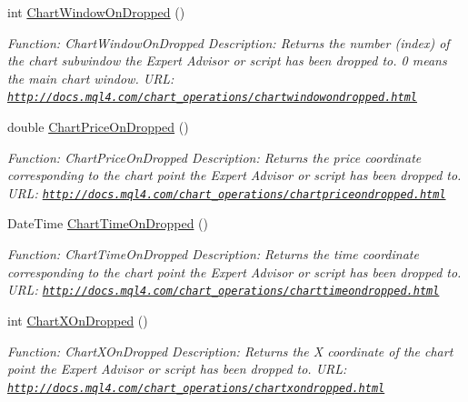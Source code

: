 \begin{DoxyCompactItemize}
int \hyperlink{class_m_q_l4_c_sharp_1_1_base_1_1_m_q_l_base_a2f82a64825cfabbef67dda36b5a57229}{Chart\+Window\+On\+Dropped} ()
\begin{DoxyCompactList}\small\item\em Function\+: Chart\+Window\+On\+Dropped Description\+: Returns the number (index) of the chart subwindow the Expert Advisor or script has been dropped to. 0 means the main chart window. U\+RL\+: \href{http://docs.mql4.com/chart_operations/chartwindowondropped.html}{\tt http\+://docs.\+mql4.\+com/chart\+\_\+operations/chartwindowondropped.\+html} \end{DoxyCompactList}\item 
double \hyperlink{class_m_q_l4_c_sharp_1_1_base_1_1_m_q_l_base_a1e259f390ed54b5fb6a45f6419029f4e}{Chart\+Price\+On\+Dropped} ()
\begin{DoxyCompactList}\small\item\em Function\+: Chart\+Price\+On\+Dropped Description\+: Returns the price coordinate corresponding to the chart point the Expert Advisor or script has been dropped to. U\+RL\+: \href{http://docs.mql4.com/chart_operations/chartpriceondropped.html}{\tt http\+://docs.\+mql4.\+com/chart\+\_\+operations/chartpriceondropped.\+html} \end{DoxyCompactList}\item 
Date\+Time \hyperlink{class_m_q_l4_c_sharp_1_1_base_1_1_m_q_l_base_a101fa12d26f5c0ac26cea66e536be603}{Chart\+Time\+On\+Dropped} ()
\begin{DoxyCompactList}\small\item\em Function\+: Chart\+Time\+On\+Dropped Description\+: Returns the time coordinate corresponding to the chart point the Expert Advisor or script has been dropped to. U\+RL\+: \href{http://docs.mql4.com/chart_operations/charttimeondropped.html}{\tt http\+://docs.\+mql4.\+com/chart\+\_\+operations/charttimeondropped.\+html} \end{DoxyCompactList}\item 
int \hyperlink{class_m_q_l4_c_sharp_1_1_base_1_1_m_q_l_base_a5e440154f02cb2151081641c4093a03f}{Chart\+X\+On\+Dropped} ()
\begin{DoxyCompactList}\small\item\em Function\+: Chart\+X\+On\+Dropped Description\+: Returns the X coordinate of the chart point the Expert Advisor or script has been dropped to. U\+RL\+: \href{http://docs.mql4.com/chart_operations/chartxondropped.html}{\tt http\+://docs.\+mql4.\+com/chart\+\_\+operations/chartxondropped.\+html} \end{DoxyCompactList}\item 

\end{DoxyCompactItemize}
